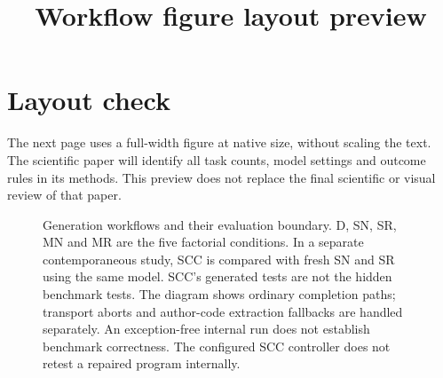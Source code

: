 \documentclass[sigconf,anonymous]{aamas}
\title{Workflow figure layout preview}
\begin{document}
\maketitle
\section{Layout check}
The next page uses a full-width figure at native size, without scaling the text.
The scientific paper will identify all task counts, model settings and outcome
rules in its methods. This preview does not replace the final scientific or
visual review of that paper.
\begin{figure}[t]
\centering

\caption{Generation workflows and their evaluation boundary. D, SN, SR, MN and
MR are the five factorial conditions. In a separate contemporaneous study, SCC
is compared with fresh SN and SR using the same model. SCC's generated tests are
not the hidden benchmark tests. The diagram shows ordinary completion paths;
transport aborts and author-code extraction fallbacks are handled separately.
An exception-free internal run does not establish benchmark correctness.
The configured SCC controller does not retest a repaired program internally.}
\end{figure}
\clearpage
\end{document}
